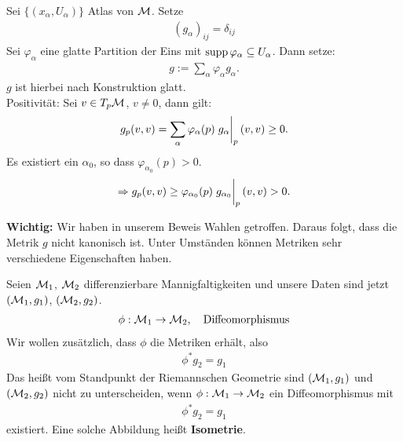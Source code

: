 \begin{bew}
Sei $\{ (x_\alpha, U_\alpha) \}$ Atlas von $\mathcal{M}$.
Setze
\begin{align*}
(g_\alpha)_{ij} = \delta_{ij}
\end{align*}
Sei $\varphi_\alpha$ eine glatte Partition der Eins mit $\operatorname{supp} \varphi_\alpha \subseteq U_\alpha$.
Dann setze:
\begin{align*}
g := \sum_\alpha \varphi_\alpha g_\alpha.
\end{align*}
$g$ ist hierbei nach Konstruktion glatt.\\
Positivität: Sei $v \in T_p \mathcal{M}$, $v \neq 0$, dann gilt:
\begin{align*}
g_p (v, v) = \sum_\alpha \varphi_\alpha (p) \eval{g_\alpha}_p (v, v) \geq 0.
\end{align*}
Es existiert ein $\alpha_0$, so dass $\varphi_{\alpha_0}(p) > 0$.
\begin{align*}
\Rightarrow g_p (v, v) \geq \varphi_{\alpha_0} (p) \eval{g_{\alpha_0}}_p (v, v) > 0.
\end{align*} 
\end{bew}
\textbf{Wichtig:} Wir haben in unserem Beweis Wahlen getroffen. 
Daraus folgt, dass die Metrik $g$ nicht kanonisch ist.
Unter Umständen können Metriken sehr verschiedene Eigenschaften haben.\\
\begin{defs}[Isometrie]
Seien $\mathcal{M}_1$, $\mathcal{M}_2$ differenzierbare Mannigfaltigkeiten und unsere Daten sind jetzt $(\mathcal{M}_1, g_1)$, $(\mathcal{M}_2, g_2)$.
\begin{align*}
\phi : \mathcal{M}_1 \to \mathcal{M}_2, \quad \text{Diffeomorphismus}
\end{align*}
Wir wollen zusätzlich, dass $\phi$ die Metriken erhält, also
\begin{align}
\phi^{\ast} g_2 = g_1
\end{align}
Das heißt vom Standpunkt der Riemannschen Geometrie sind $(\mathcal{M}_1, g_1)$ und $(\mathcal{M}_2, g_2)$ nicht zu unterscheiden,
wenn $\phi: \mathcal{M}_1 \to \mathcal{M}_2$ ein Diffeomorphismus mit
\begin{align}
\phi^\ast g_2 = g_1
\end{align}
existiert.
Eine solche Abbildung heißt \textbf{Isometrie}.
\end{defs}

